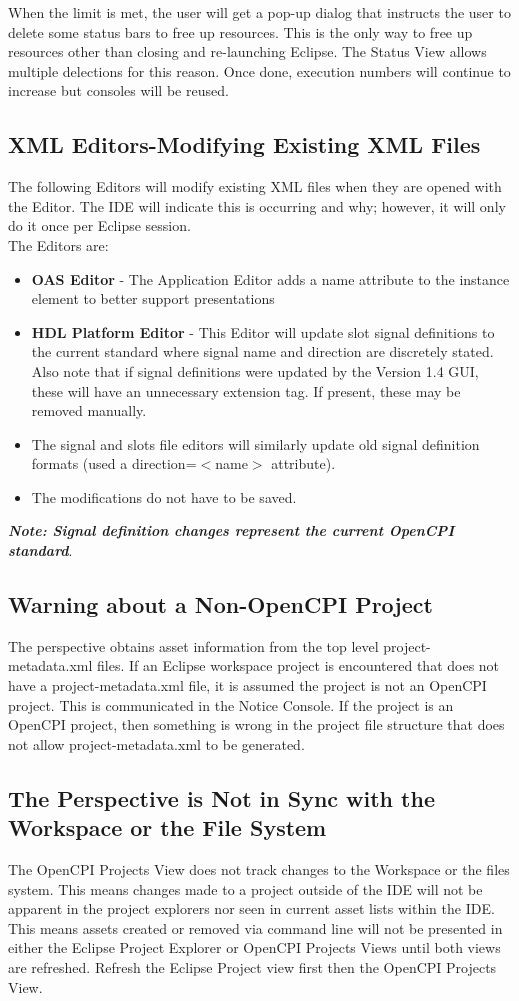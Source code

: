 When the limit is met, the user will get a pop-up dialog that instructs the user to delete some status bars to free up resources. This is the only way to free up resources other than closing and re-launching Eclipse. The Status View allows multiple delections for this reason. Once done, execution numbers will continue to increase but consoles will be reused.

\subsection{XML Editors-Modifying Existing XML Files}
The following Editors will modify existing XML files when they are opened with the Editor. The IDE will indicate this is occurring and why; however, it will only do it once per Eclipse session.\\
The Editors are:
\begin{itemize}
\item	\textbf{OAS Editor} - The Application Editor adds a name attribute to the instance element to better support presentations
\item	\textbf{HDL Platform Editor} - This Editor will update slot signal definitions to the current standard where signal name and direction are discretely stated. Also note that if signal definitions were updated by the Version 1.4 GUI, these will have an unnecessary extension tag. If present, these may be removed manually.
\item	[]The signal and slots file editors will similarly update old signal definition formats (used a direction=$<$name$>$ attribute).
\item [] The modifications do not have to be saved.\
\end{itemize}
\textbf{\emph{Note: Signal definition changes represent the current OpenCPI standard}}.
\subsection {Warning about a Non-OpenCPI Project}
The perspective obtains asset information from the top level project-metadata.xml files. If an Eclipse workspace project is encountered that does not have a project-metadata.xml file, it is assumed the project is not an OpenCPI project. This is communicated in the Notice Console. If the project is an OpenCPI project, then something is wrong in the project file structure that does not allow project-metadata.xml to be generated.
\subsection{The Perspective is Not in Sync with the Workspace or the File System}
The OpenCPI Projects View does not track changes to the Workspace or the files system. This means changes made to a project outside of the IDE will not be apparent in the project explorers nor seen in current asset lists within the IDE. This means assets created or removed via command line will not be presented in either the Eclipse Project Explorer or OpenCPI Projects Views until both views are refreshed. Refresh the Eclipse Project view first then the OpenCPI Projects View.\\


